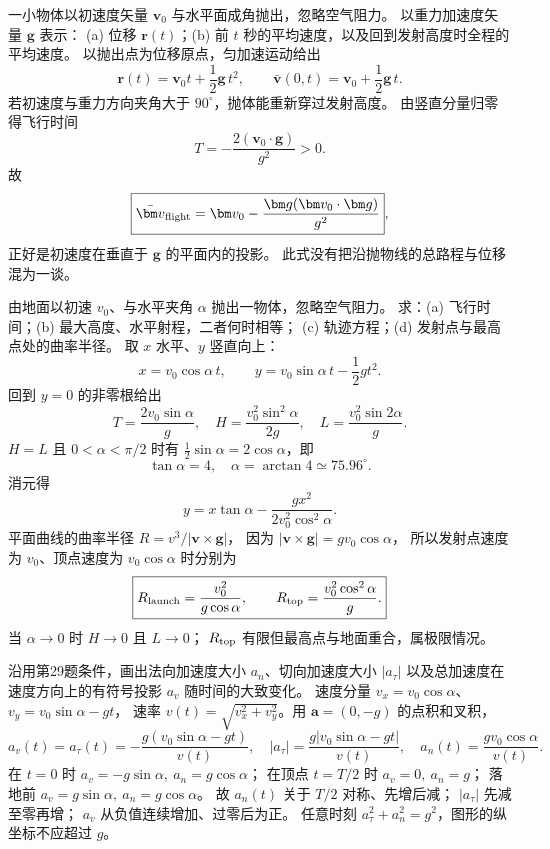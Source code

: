 一小物体以初速度矢量 $\bm v_0$ 与水平面成角抛出，忽略空气阻力。
以重力加速度矢量 $\bm g$ 表示：
(a) 位移 $\bm r(t)$；(b) 前 $t$ 秒的平均速度，以及回到发射高度时全程的平均速度。
\exsolution
以抛出点为位移原点，匀加速运动给出
\[
 \boxed{\bm r(t)=\bm v_0t+\frac12\bm g\,t^2,\qquad
 \bar{\bm v}(0,t)=\bm v_0+\frac12\bm g\,t.}
\]
若初速度与重力方向夹角大于 $90^\circ$，抛体能重新穿过发射高度。
由竖直分量归零得飞行时间
\[
 T=-\frac{2(\bm v_0\cdot\bm g)}{g^2}>0.
\]
故
\[
 \boxed{\bar{\bm v}_{\rm flight}=
 \bm v_0-\frac{\bm g(\bm v_0\cdot\bm g)}{g^2}},
\]
正好是初速度在垂直于 $\bm g$ 的平面内的投影。
\excheck 此式没有把沿抛物线的总路程与位移混为一谈。

由地面以初速 $v_0$、与水平夹角 $\alpha$ 抛出一物体，忽略空气阻力。
求：(a) 飞行时间；(b) 最大高度、水平射程，二者何时相等；
(c) 轨迹方程；(d) 发射点与最高点处的曲率半径。
\exsolution
取 $x$ 水平、$y$ 竖直向上：
\[
 x=v_0\cos\alpha\,t,\qquad
 y=v_0\sin\alpha\,t-\frac12gt^2.
\]
回到 $y=0$ 的非零根给出
\[
 \boxed{T=\frac{2v_0\sin\alpha}{g},\quad
 H=\frac{v_0^2\sin^2\alpha}{2g},\quad
 L=\frac{v_0^2\sin2\alpha}{g}.}
\]
$H=L$ 且 $0<\alpha<\pi/2$ 时有
$\frac12\sin\alpha=2\cos\alpha$，即
\[
 \boxed{\tan\alpha=4,\quad\alpha=\arctan4\simeq75.96^\circ.}
\]
消元得
\[
 \boxed{y=x\tan\alpha-
 \frac{gx^2}{2v_0^2\cos^2\alpha}}.
\]
平面曲线的曲率半径 $R=v^3/|\bm v\times\bm g|$，
因为 $|\bm v\times\bm g|=gv_0\cos\alpha$，
所以发射点速度为 $v_0$、顶点速度为 $v_0\cos\alpha$ 时分别为
\[
 \boxed{R_{\rm launch}=\frac{v_0^2}{g\cos\alpha},\qquad
 R_{\rm top}=\frac{v_0^2\cos^2\alpha}{g}.}
\]
\excheck 当 $\alpha\to0$ 时 $H\to0$ 且 $L\to0$；
$R_{\rm top}$ 有限但最高点与地面重合，属极限情况。

沿用第29题条件，画出法向加速度大小 $a_n$、切向加速度大小 $|a_\tau|$
以及总加速度在速度方向上的有符号投影 $a_v$ 随时间的大致变化。
\exsolution
速度分量 $v_x=v_0\cos\alpha$、$v_y=v_0\sin\alpha-gt$，
速率 $v(t)=\sqrt{v_x^2+v_y^2}$。用 $\bm a=(0,-g)$ 的点积和叉积，
\[
 \boxed{a_v(t)=a_\tau(t)=-\frac{g(v_0\sin\alpha-gt)}{v(t)},\quad
 |a_\tau|=\frac{g|v_0\sin\alpha-gt|}{v(t)},\quad
 a_n(t)=\frac{gv_0\cos\alpha}{v(t)}.}
\]
在 $t=0$ 时 $a_v=-g\sin\alpha,\ a_n=g\cos\alpha$；
在顶点 $t=T/2$ 时 $a_v=0,\ a_n=g$；
落地前 $a_v=g\sin\alpha,\ a_n=g\cos\alpha$。
故 $a_n(t)$ 关于 $T/2$ 对称、先增后减；
$|a_\tau|$ 先减至零再增；
$a_v$ 从负值连续增加、过零后为正。
\excheck 任意时刻 $a_\tau^2+a_n^2=g^2$，图形的纵坐标不应超过 $g$。
